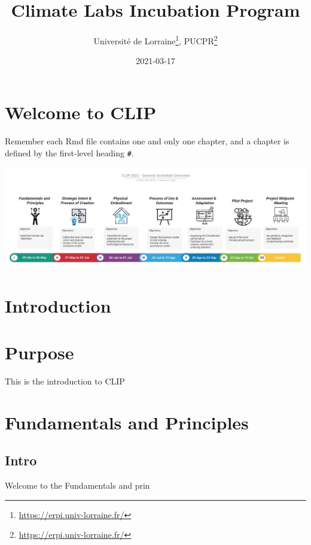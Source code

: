 \documentclass[
]{book}
\title{Climate Labs Incubation Program}
\author{Université de Lorraine\footnote{\url{https://erpi.univ-lorraine.fr/}}, PUCPR\footnote{\url{https://erpi.univ-lorraine.fr/}}}
\date{2021-03-17}
\begin{document}
\maketitle

{
\setcounter{tocdepth}{1}
\tableofcontents
}
\hypertarget{welcome-to-clip}{%
\chapter*{Welcome to CLIP}\label{welcome-to-clip}}

Remember each Rmd file contains one and only one chapter, and a chapter is defined by the first-level heading \texttt{\#}.

\includegraphics{Figures/CLIP-global-00.jpg}

\hypertarget{introduction}{%
\chapter*{Introduction}\label{introduction}}

\hypertarget{purpose}{%
\chapter*{Purpose}\label{purpose}}

This is the introduction to CLIP

\hypertarget{intro}{%
\chapter{Fundamentals and Principles}\label{intro}}

\hypertarget{intro-1}{%
\section{Intro}\label{intro-1}}

Welcome to the Fundamentals and prin
\end{document}
